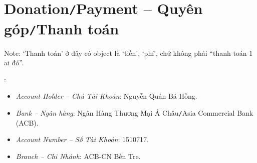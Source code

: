 \documentclass[12pt,oneside]{book}
\begin{document}
\section{Donation{\tt/}Payment -- Quyên góp{\tt/}Thanh toán}
Note: `Thanh toán' ở đây có object là `tiền', `phí', chứ không phải ``thanh toán 1 ai đó''.
\vspace{2mm}

:
\begin{itemize}
	\item {\it Account Holder -- Chủ Tài Khoản}: {\sc Nguyễn Quản Bá Hồng}.
	\item {\it Bank -- Ngân hàng}: Ngân Hàng Thương Mại Á Châu{\tt/}Asia Commercial Bank (ACB).
	\item {\it Account Number -- Số Tài Khoản}: 1510717.
	\item {\it Branch -- Chi Nhánh}: ACB-CN Bến Tre.
\end{itemize}


\printglossaries

\printbibliography[heading=bibintoc]
\label{ref}
	
\end{document}
